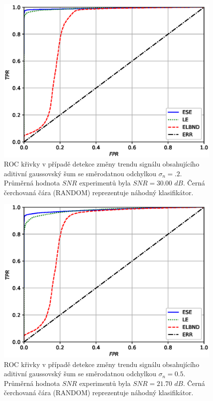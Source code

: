\begin{figure}[ht!]
    \centering
    \includegraphics[scale=0.7]{IMG/appel_roc/roc_02.eps}
    \caption{ROC křivky v případě detekce změny trendu signálu obsahujícího aditivní gaussovský šum se směrodatnou odchylkou $\sigma_n=.2$. Průměrná hodnota $SNR$ experimentů byla $SNR=30.00$ $dB$. Černá čerchovaná čára (RANDOM) reprezentuje náhodný klasifikátor.}
    \label{fig:roc_02}
\end{figure}
\begin{figure}[ht!]
    \centering
    \includegraphics[scale=0.73]{IMG/appel_roc/roc_05.eps}
    \caption{ROC křivky v případě detekce změny trendu signálu obsahujícího aditivní gaussovský šum se směrodatnou odchylkou $\sigma_n=0.5$. Průměrná hodnota $SNR$ experimentů byla $SNR=21.70$ $dB$. Černá čerchovaná čára (RANDOM) reprezentuje náhodný klasifikátor.}
    \label{fig:roc_05}
\end{figure}
